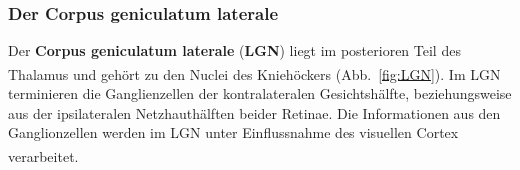 \documentclass[12pt,a4paper,pdftex]{article}
\begin{document}

\newpage
\subsubsection*{Der Corpus geniculatum laterale}

Der \textbf{Corpus geniculatum laterale} (\textbf{LGN})  liegt im posterioren Teil des Thalamus und gehört zu den Nuclei des Kniehöckers (Abb.~\ref{fig:LGN}). \textsuperscript{\cite[12]{crossman2014neuroanatomy}} Im LGN terminieren die Ganglienzellen der kontralateralen Gesichtshälfte, beziehungsweise aus der ipsilateralen Netzhauthälften beider Retinae. Die Informationen aus den Ganglionzellen werden im LGN unter Einflussnahme des visuellen Cortex verarbeitet.
\textsuperscript{\cite[8.1]{trepel2011neuroanatomie}}
\end{document}
